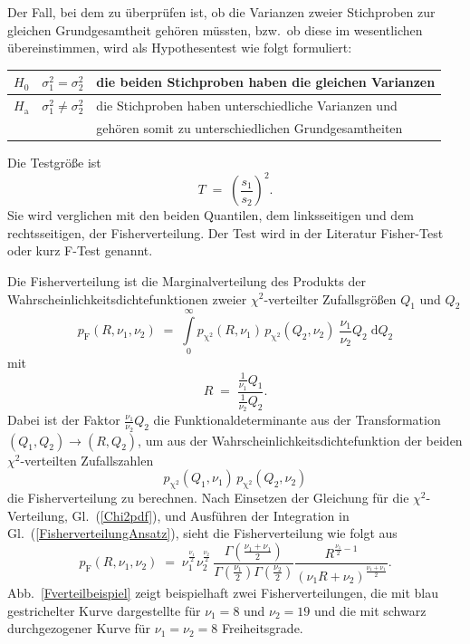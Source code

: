 Der Fall, bei dem zu überprüfen ist, ob die Varianzen zweier Stichproben zur gleichen
Grundgesamtheit gehören müssten, bzw.\ ob diese im wesentlichen übereinstimmen, wird
als Hypothesentest wie folgt formuliert:
\begin{center}
\begin{tabular}{c|cl}
$H_0$ & $\sigma_1^2 = \sigma_2^2$ & die beiden Stichproben haben die gleichen Varianzen\\
\hline
$H_\mathrm{a}$ & $\sigma_1^2 \neq \sigma_2^2$ & die Stichproben haben unterschiedliche Varianzen
und \\
 &  & gehören somit zu unterschiedlichen Grundgesamtheiten
\end{tabular}
\end{center}
Die Testgröße ist
\begin{equation}
T \; = \; \left( \frac{s_1}{s_2} \right)^2.
\label{Ftestgroesse}
\end{equation}
Sie wird verglichen mit den beiden Quantilen, dem linksseitigen und dem rechtsseitigen, der Fisherverteilung.
Der Test wird in der Literatur Fisher-Test oder kurz F-Test genannt.

Die Fisherverteilung ist die Marginalverteilung des Produkts der Wahrscheinlichkeitsdichtefunktionen zweier
$\chi^2$-verteilter Zufallsgrößen $Q_1$ und $Q_2$
\begin{equation}
p_\mathrm{F}(R, \nu_1, \nu_2) \; = \; \int\limits_0^{\infty}
p_\mathrm{\chi^2}(R, \nu_1) \, p_\mathrm{\chi^2}(Q_2, \nu_2) \; \frac{\nu_1}{\nu_2} Q_2 \;
\mathrm{d} Q_2
\label{FisherverteilungAnsatz}
\end{equation}
mit
\begin{equation}
R  \; = \; \frac{\frac{1}{\nu_1} Q_1}{\frac{1}{\nu_2} Q_2} .
\label{TrafoQ1Q2}
\end{equation}
Dabei ist der Faktor $\frac{\nu_1}{\nu_2} Q_2$
die Funktionaldeterminante aus der Transformation $(Q_1, Q_2) \rightarrow (R, Q_2)$,
um aus der Wahrscheinlichkeitsdichtefunktion der beiden $\chi^2$-verteilten Zufallszahlen
$$
p_\mathrm{\chi^2}(Q_1, \nu_1) \, p_\mathrm{\chi^2}(Q_2, \nu_2)
$$
die Fisherverteilung zu berechnen. Nach Einsetzen der Gleichung für
die $\chi^2$-Verteilung, Gl.~(\ref{Chi2pdf}), und Ausführen der Integration
in Gl.~(\ref{FisherverteilungAnsatz}), sieht die Fisherverteilung wie folgt aus
\begin{equation}
p_\mathrm{F}(R, \nu_1, \nu_2) \; = \;
\nu_1^{\frac{\nu_1}{2}} \nu_2^{\frac{\nu_2}{2}} \,
\frac{\Gamma\left(\frac{\nu_1+\nu_1}{2}\right)}
{\Gamma\left(\frac{\nu_1}{2}\right)\Gamma\left(\frac{\nu_2}{2}\right)}
\frac{R^{\frac{\nu_1}{2}-1}}{\left(\nu_1 R + \nu_2 \right)^\frac{\nu_1+\nu_1}{2}} .
\label{Fisherpdf}
\end{equation}
Abb.~\ref{Fverteilbeispiel} zeigt beispielhaft zwei Fisherverteilungen, die mit
blau gestrichelter Kurve dargestellte für $\nu_1 = 8$ und $\nu_2 = 19$ und die mit
schwarz durchgezogener Kurve für $\nu_1 = \nu_2 = 8$ Freiheitsgrade.

